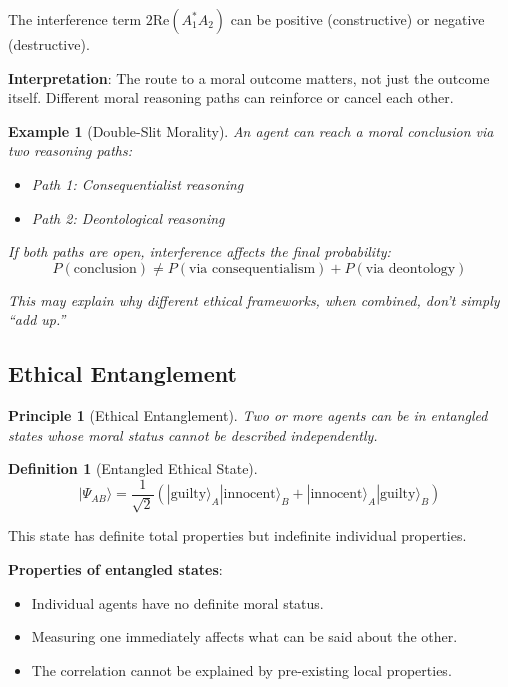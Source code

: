 \documentclass[12pt]{article}
\newtheorem{definition}{Definition}[section]
\newtheorem{principle}{Principle}
\newtheorem{example}{Example}[section]
\begin{document}
The interference term $2\mathrm{Re}(A_1^* A_2)$ can be positive (constructive) or negative (destructive).

\textbf{Interpretation}: The route to a moral outcome matters, not just the outcome itself. Different moral reasoning paths can reinforce or cancel each other.

\begin{example}[Double-Slit Morality]
An agent can reach a moral conclusion via two reasoning paths:
\begin{itemize}
    \item Path 1: Consequentialist reasoning
    \item Path 2: Deontological reasoning
\end{itemize}

If both paths are open, interference affects the final probability:
\begin{equation}
    P(\text{conclusion}) \neq P(\text{via consequentialism}) + P(\text{via deontology})
\end{equation}

This may explain why different ethical frameworks, when combined, don't simply ``add up.''
\end{example}

\subsection{Ethical Entanglement}

\begin{principle}[Ethical Entanglement]
\emph{Two or more agents can be in entangled states whose moral status cannot be described independently.}
\end{principle}

\begin{definition}[Entangled Ethical State]
\begin{equation}
    |\Psi_{AB}\rangle = \frac{1}{\sqrt{2}} \left( |\text{guilty}\rangle_A |\text{innocent}\rangle_B + |\text{innocent}\rangle_A |\text{guilty}\rangle_B \right)
\end{equation}
\end{definition}

This state has definite total properties but indefinite individual properties.

\textbf{Properties of entangled states}:
\begin{itemize}
    \item Individual agents have no definite moral status.
    \item Measuring one immediately affects what can be said about the other.
    \item The correlation cannot be explained by pre-existing local properties.
\end{itemize}
\end{document}
